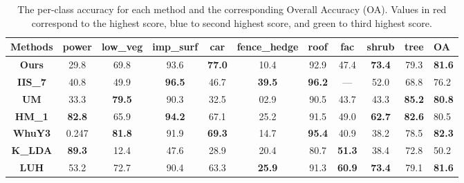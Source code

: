 \documentclass[final,3p,times,twocolumn,authoryear]{elsarticle}
\begin{document}
\begin{table*}[]
\centering
\caption{The per-class accuracy for each method and the corresponding Overall Accuracy (OA). Values in red correspond to the highest score, blue to second highest score, and green to third highest score.}
\label{tab:accuracy}
\begin{tabular}{c|ccccccccc|l}
\textbf{Methods} & \textbf{power}  & \textbf{low\_veg}  & \textbf{imp\_surf} & \textbf{car} & \textbf{fence\_hedge} & \textbf{roof} & \textbf{fac} & \textbf{shrub} & \textbf{tree} & \textbf{OA}   \\ \hline
\textbf{Ours}   & 29.8   & 69.8    & 93.6   & {\color[HTML]{FE0000} \textbf{77.0}} & 10.4  & 92.9   & 47.4   & {\color[HTML]{FE0000} \textbf{73.4}} & 79.3   & {\color[HTML]{3531FF} \textbf{81.6}} \\
\textbf{IIS\_7} & 40.8  & 49.9 & {\color[HTML]{FE0000} \textbf{96.5}} & 46.7 & {\color[HTML]{FE0000} \textbf{39.5}} & {\color[HTML]{FE0000} \textbf{96.2}} & --- & 52.0 & 68.8 & 76.2                \\
\textbf{UM}     & 33.3  & {\color[HTML]{3531FF} \textbf{79.5}}  & 90.3 & 32.5 & 02.9 & 90.5 & 43.7  & 43.3    & {\color[HTML]{FE0000} \textbf{85.2}} & {\color[HTML]{009901}\textbf{80.8}}          \\
\textbf{HM\_1}  & {\color[HTML]{3531FF} \textbf{82.8}} & 65.9 & {\color[HTML]{3531FF} \textbf{94.2}} & 67.1 & 25.2 & 91.5 & 49.0 & {\color[HTML]{3531FF} \textbf{62.7}} & {\color[HTML]{3531FF} \textbf{82.6}} & 80.5 \\
\textbf{WhuY3}  & 0.247 & {\color[HTML]{FE0000} \textbf{81.8}} & 91.9 & {\color[HTML]{3531FF} \textbf{69.3}} & 14.7 & {\color[HTML]{3531FF} \textbf{95.4}} & 40.9 & 38.2 & 78.5 & {\color[HTML]{FE0000} \textbf{82.3}} \\
\textbf{K\_LDA} & {\color[HTML]{FE0000} \textbf{89.3}} & 12.4 & 47.6 & 28.9 & 20.4 & 80.7 & {\color[HTML]{3531FF} \textbf{51.3}} & 38.4 & 72.8 & 50.2                          \\
\textbf{LUH} & 53.2 & 72.7 & 90.4 & 63.3 & {\color[HTML]{3531FF} \textbf{25.9}} & 91.3 & {\color[HTML]{FE0000} \textbf{60.9}} & {\color[HTML]{FE0000} \textbf{73.4}} & 79.1 & {\color[HTML]{3531FF} \textbf{81.6}} \\
\cline{1-11}
\end{tabular}
\end{table*}
\end{document}
